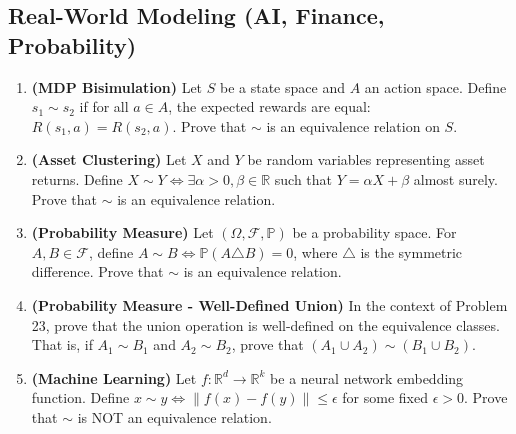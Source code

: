 \documentclass[11pt, a4paper]{article}
\theoremstyle{definition}
\theoremstyle{remark}
\newcommand{\R}{\mathbb{R}}
\newcommand{\Prob}{\mathbb{P}}
\newcommand{\F}{\mathcal{F}}
\begin{document}
\subsection{Real-World Modeling (AI, Finance, Probability)}
\begin{enumerate}[label=\textbf{\arabic*.}, start=21]
    \item \textbf{(MDP Bisimulation)} Let $S$ be a state space and $A$ an action space. Define $s_1 \sim s_2$ if for all $a \in A$, the expected rewards are equal: $R(s_1, a) = R(s_2, a)$. Prove that $\sim$ is an equivalence relation on $S$.
    \item \textbf{(Asset Clustering)} Let $X$ and $Y$ be random variables representing asset returns. Define $X \sim Y \iff \exists \alpha > 0, \beta \in \R$ such that $Y = \alpha X + \beta$ almost surely. Prove that $\sim$ is an equivalence relation.
    \item \textbf{(Probability Measure)} Let $(\Omega, \F, \Prob)$ be a probability space. For $A, B \in \F$, define $A \sim B \iff \Prob(A \triangle B) = 0$, where $\triangle$ is the symmetric difference. Prove that $\sim$ is an equivalence relation.
    \item \textbf{(Probability Measure - Well-Defined Union)} In the context of Problem 23, prove that the union operation is well-defined on the equivalence classes. That is, if $A_1 \sim B_1$ and $A_2 \sim B_2$, prove that $(A_1 \cup A_2) \sim (B_1 \cup B_2)$.
    \item \textbf{(Machine Learning)} Let $f: \R^d \to \R^k$ be a neural network embedding function. Define $x \sim y \iff \|f(x) - f(y)\| \le \epsilon$ for some fixed $\epsilon > 0$. Prove that $\sim$ is NOT an equivalence relation.
\end{enumerate}
\end{document}
